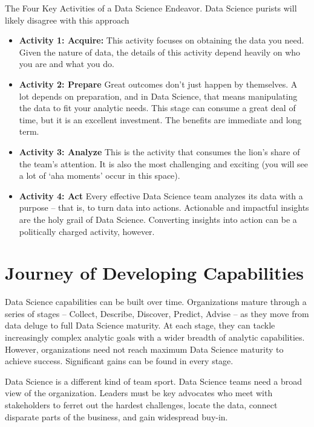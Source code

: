 \documentclass{rapportECL}
\begin{document}
The Four Key Activities of a Data Science Endeavor. Data Science purists will likely disagree with this approach


\begin{itemize}
    
    
    \item \textbf{Activity 1: Acquire:} This activity focuses on obtaining the data you need. Given the nature of data, the details of this activity depend heavily on who you are and what you do. 

    \item \textbf{Activity 2: Prepare} Great outcomes don’t just happen by themselves. A lot depends on preparation, and in Data Science, that means manipulating the data to fit your analytic needs. This stage can consume a great deal of time, but it is an excellent investment. The benefits are immediate and long term.

    \item \textbf{Activity 3: Analyze} This is the activity that consumes the lion’s share of the team’s attention. It is also the most challenging and exciting (you will see a lot of ‘aha moments’ occur in this space). 

    \item \textbf{Activity 4: Act} Every effective Data Science team analyzes its data with a purpose – that is, to turn data into actions. Actionable and impactful insights are the holy grail of Data Science. Converting insights into action can be a politically charged activity, however.
    
\end{itemize}





\section{Journey of Developing Capabilities}

Data Science capabilities can be built over time. Organizations mature through a series of stages – Collect, Describe, Discover, Predict, Advise – as they move from data deluge to full Data Science maturity. At each stage, they can tackle increasingly complex analytic goals with a wider breadth of analytic capabilities. However, organizations need not reach maximum Data Science maturity to achieve success. Significant gains can be found in every stage.


Data Science is a different kind of team sport. Data Science teams need a broad view of the organization. Leaders must be key advocates who meet with stakeholders to ferret out the hardest challenges, locate the data, connect disparate parts of the business, and gain widespread buy-in.
\end{document}
